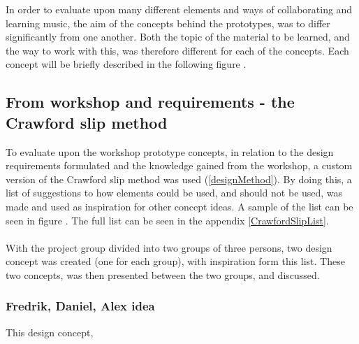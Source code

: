 In order to evaluate upon many different elements and ways of collaborating and learning music, the aim of the concepts behind the prototypes, was to differ significantly from one another. Both the topic of the material to be learned, and the way to work with this, was therefore different for each of the concepts. Each concept will be briefly described in the following figure . 


\subsection{From workshop and requirements - the Crawford slip method}
To evaluate upon the workshop prototype concepts, in relation to the design requirements formulated and the knowledge gained from the workshop, a custom version of the Crawford slip method was used (\autoref{designMethod}). By doing this, a list of suggestions to how elements could be used, and should not be used, was made and used as inspiration for other concept ideas. A sample of the list can be seen in figure . The full list can be seen in the appendix \autoref{CrawfordSlipList}.  
\\\\


With the project group divided into two groups of three persons, two design concept was created (one for each group), with inspiration form this list. These two concepts, was then presented between the two groups, and discussed.  

\subsubsection{Fredrik, Daniel, Alex idea}
This design concept, 

